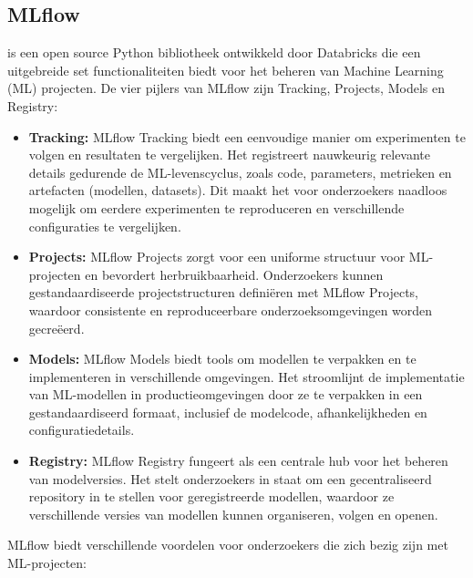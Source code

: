 \subsection{MLflow}

\textcite{MLflow2023} is een open source Python bibliotheek ontwikkeld door Databricks die een uitgebreide set functionaliteiten biedt voor het beheren van Machine Learning (ML) projecten. De vier pijlers van MLflow zijn Tracking, Projects, Models en Registry:

\begin{itemize}
    \item \textbf{Tracking:} MLflow Tracking biedt een eenvoudige manier om experimenten te volgen en resultaten te vergelijken. Het registreert nauwkeurig relevante details gedurende de ML-levenscyclus, zoals code, parameters, metrieken en artefacten (modellen, datasets). Dit maakt het voor onderzoekers naadloos mogelijk om eerdere experimenten te reproduceren en verschillende configuraties te vergelijken.
    \item \textbf{Projects:} MLflow Projects zorgt voor een uniforme structuur voor ML-projecten en bevordert herbruikbaarheid. Onderzoekers kunnen gestandaardiseerde projectstructuren definiëren met MLflow Projects, waardoor consistente en reproduceerbare onderzoeksomgevingen worden gecreëerd.
    \item \textbf{Models:} MLflow Models biedt tools om modellen te verpakken en te implementeren in verschillende omgevingen. Het stroomlijnt de implementatie van ML-modellen in productieomgevingen door ze te verpakken in een gestandaardiseerd formaat, inclusief de modelcode, afhankelijkheden en configuratiedetails.
    \item \textbf{Registry:} MLflow Registry fungeert als een centrale hub voor het beheren van modelversies. Het stelt onderzoekers in staat om een gecentraliseerd repository in te stellen voor geregistreerde modellen, waardoor ze verschillende versies van modellen kunnen organiseren, volgen en openen.
\end{itemize}

MLflow biedt verschillende voordelen voor onderzoekers die zich bezig zijn met ML-projecten:

